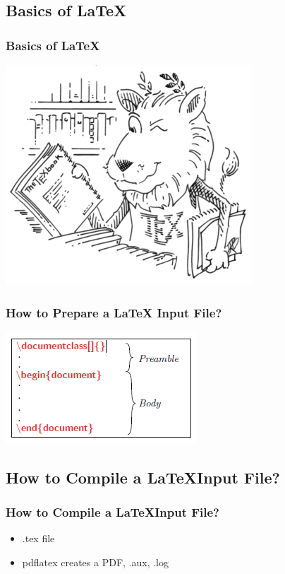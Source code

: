 \documentclass[12pt]{beamer}
\begin{document}
\begin{frame}			
\section{ Basics of \LaTeX	}	
\frametitle{ Basics of \LaTeX	}	
\begin{center}
	\includegraphics[width=0.7\linewidth]{lion}
\end{center}

\end{frame}
\begin{frame}			
\frametitle{How to Prepare a \LaTeX \hspace{1pt} Input File?}
\begin{center}
		\includegraphics[scale=0.5]{first_file}
\end{center}
\end{frame}
\begin{frame}		
\section{ How to Compile a \LaTeX Input File?}	
\frametitle{ How to Compile a \LaTeX Input File?}
\begin{itemize}\justifying
	\item .tex file 
	\item pdflatex creates a PDF, .aux, .log
\end{itemize}
\end{frame}
\end{document}
